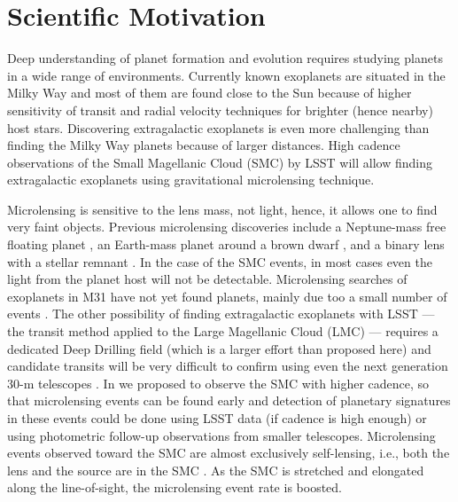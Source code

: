 \documentclass[12pt,letterpaper]{article}
\begin{document}
\clearpage

\section{Scientific Motivation}

Deep understanding of planet formation and evolution requires 
studying planets in a wide range of environments.  Currently known exoplanets 
are situated in the Milky Way and most of them are found close to the Sun 
because of higher sensitivity of transit and radial velocity techniques for 
brighter (hence nearby) host stars.  Discovering extragalactic exoplanets 
is even more challenging than finding the Milky Way planets because of 
larger distances.  High cadence observations of 
the Small Magellanic Cloud (SMC) by LSST will allow 
finding extragalactic exoplanets using gravitational microlensing 
technique.  

Microlensing is sensitive to the lens mass, not light, hence, 
it allows one to find very faint objects.  Previous microlensing 
discoveries include a Neptune-mass free floating planet \citep{mroz18a}, 
an Earth-mass planet around a brown dwarf \citep{shvartzvald17b}, and 
a binary lens with a stellar remnant \citep{shvartzvald15}. 
In the case of the SMC events, in most cases even the light from the planet host will not be detectable.  
Microlensing searches of exoplanets in M31 
have not yet found planets, mainly due too a small number of events 
\citep{ingrosso09,calchinovati14,lee15}.  The other possibility of 
finding extragalactic exoplanets with LSST --- the transit method applied 
to the Large Magellanic Cloud (LMC) --- requires a dedicated Deep Drilling field 
(which is a larger effort than proposed here) and candidate transits will be 
very difficult to confirm using even the next generation 30-m telescopes 
\citep{lund15,jacklin15}.  In \citet{mroz18b} we proposed to observe the SMC with 
higher cadence, so that microlensing events can be found early and 
detection of planetary signatures in these events could be done using 
LSST data (if cadence is high enough) or using photometric follow-up 
observations from smaller telescopes.  Microlensing events observed toward
the SMC are almost exclusively self-lensing, i.e., both the lens and 
the source are in the SMC \citep{sahu98,wyrzykowski11b}.  As the SMC 
is stretched and elongated 
along the line-of-sight, the microlensing event rate is boosted.
\end{document}
